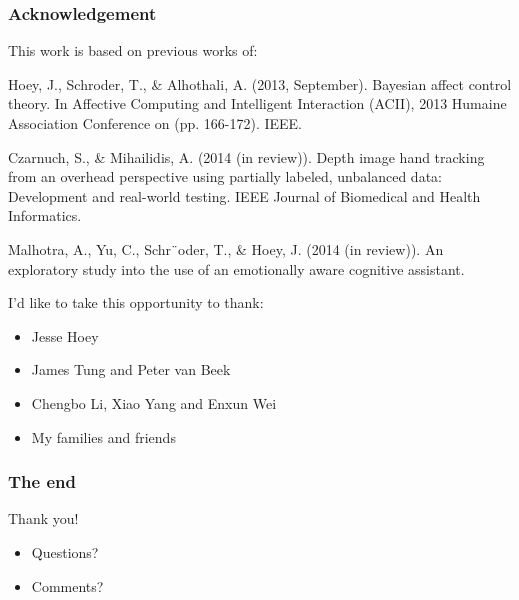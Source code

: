 \documentclass{beamer}
\begin{document}
\begin{frame}
\frametitle{Acknowledgement}
This work is based on previous works of:
\begin{itemize}
\footnotesize{
\item Hoey, J., Schroder, T., \& Alhothali, A. (2013, September). Bayesian affect control theory. In Affective Computing and Intelligent Interaction (ACII), 2013 Humaine Association Conference on (pp. 166-172). IEEE.
\item Czarnuch, S., \& Mihailidis, A. (2014 (in review)). Depth image hand tracking from an overhead perspective using partially labeled, unbalanced data: Development and real-world testing. IEEE Journal of Biomedical and Health Informatics.
\item Malhotra, A., Yu, C., Schr¨oder, T., \& Hoey, J. (2014 (in review)). An exploratory study into the use of an emotionally aware cognitive assistant.
}
\end{itemize}
\vspace{0.3cm}
I'd like to take this opportunity to thank:
\begin{itemize}
\item Jesse Hoey
\item James Tung and Peter van Beek
\item Chengbo Li, Xiao Yang and Enxun Wei
\item My families and friends
\end{itemize}
\end{frame}
\begin{frame}
\frametitle{The end}
\Huge{\centerline{Thank you!}}   
\fontsize{5mm}{4mm}
\begin{itemize}
\item Questions?
\item Comments?
\end{itemize}
\end{frame}

\end{document}

